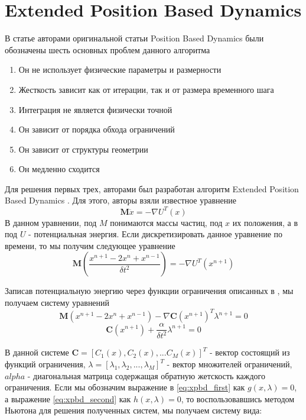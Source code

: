 \section{Extended Position Based Dynamics} \label{ch2:xpbd} %
	В статье \cite{muller2020detailed} авторами оригинальной статьи Position Based Dynamics были обозначены шесть основных проблем данного алгоритма
	\begin{enumerate}[1.]
		\item Он не использует физические параметры и размерности
		\item Жесткость зависит как от итерации, так и от размера временного шага
		\item Интеграция не является физически точной
		\item Он зависит от порядка обхода ограничений
		\item Он зависит от структуры геометрии
		\item Он медленно сходится
	\end{enumerate}
	Для решения первых трех, авторами был разработан алгоритм Extended Position Based Dynamics \cite{xpbd}. Для этого, авторы взяли известное уравнение
	\begin{equation}
		\textbf{M}\ddot{x} = -\nabla U^T(x)
	\end{equation}
	В данном уравнении, под $M$ понимаются массы частиц, под $x$ их положения, а в под $U$ - потенциальная энергия. Если дискретизировать данное уравнение по времени, то мы получим следующее уравнение
	\begin{equation}
		\textbf{M}(\frac{x^{n+1} - 2x^n + x^{n-1}}{\delta t^2}) = -\nabla U^T(x^{n+1})
	\end{equation}
	
	Записав потенциальную энергию через функции ограничения описанных в \cite{servin2006interactive}, мы получаем систему уравнений
	\begin{equation} \label{eq:xpbd_first}
		\textbf{M}(x^{n+1} - 2x^n + x^{n-1}) - \nabla \textbf{C}(x^{n+1})^T\lambda^{n+1} = 0
	\end{equation}
	\begin{equation} \label{eq:xpbd_second}
		\textbf{C}(x^{n+1}) + \frac{\alpha}{\delta t^2}\lambda^{n+1} = 0		
	\end{equation}
	
	В данной системе $\textbf{C} = [C_1(x), C_2(x),... C_M(x)]^T$ - вектор состоящий из функций ограничения, $\lambda = [\lambda_1, \lambda_2, ..., \lambda_M]^T$ - вектор множителей ограничений, $alpha$ - диагональная матрица содержащая обратную жетскость каждого ограничения. Если мы обозначим выражение в \ref{eq:xpbd_first} как $g(x, \lambda) = 0$, а выражение \ref{eq:xpbd_second} как $h(x, \lambda) = 0$, то воспользовавшись методом Ньютона для решения полученных систем, мы получаем систему вида:

